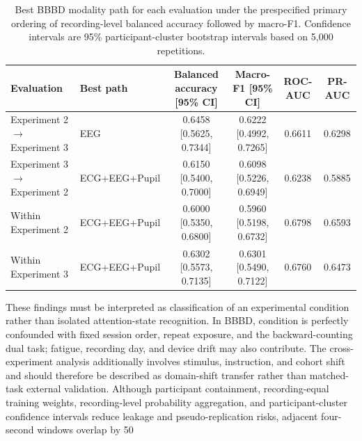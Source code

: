\begin{table}[t]
\centering
\caption{Best BBBD modality path for each evaluation under the prespecified
primary ordering of recording-level balanced accuracy followed by macro-F1.
Confidence intervals are 95\% participant-cluster bootstrap intervals based on
5,000 repetitions.}
\label{tab:bbbd_best_paths}
\small
\setlength{\tabcolsep}{4pt}
\begin{tabular}{llcccc}
\hline
Evaluation & Best path & Balanced accuracy [95\% CI] &
Macro-F1 [95\% CI] & ROC-AUC & PR-AUC \\
\hline
Experiment 2 $\rightarrow$ Experiment 3 & EEG & 0.6458 [0.5625, 0.7344] & 0.6222 [0.4992, 0.7265] & 0.6611 & 0.6298 \\
Experiment 3 $\rightarrow$ Experiment 2 & ECG+EEG+Pupil & 0.6150 [0.5400, 0.7000] & 0.6098 [0.5226, 0.6949] & 0.6238 & 0.5885 \\
Within Experiment 2 & ECG+EEG+Pupil & 0.6000 [0.5350, 0.6800] & 0.5960 [0.5198, 0.6732] & 0.6798 & 0.6593 \\
Within Experiment 3 & ECG+EEG+Pupil & 0.6302 [0.5573, 0.7135] & 0.6301 [0.5490, 0.7122] & 0.6760 & 0.6473 \\
\hline
\end{tabular}
\end{table}

These findings must be interpreted as classification of an experimental condition rather than isolated attention-state recognition. In BBBD, condition is perfectly confounded with fixed session order, repeat exposure, and the backward-counting dual task; fatigue, recording day, and device drift may also contribute. The cross-experiment analysis additionally involves stimulus, instruction, and cohort shift and should therefore be described as domain-shift transfer rather than matched-task external validation. Although participant containment, recording-equal training weights, recording-level probability aggregation, and participant-cluster confidence intervals reduce leakage and pseudo-replication risks, adjacent four-second windows overlap by 50%

